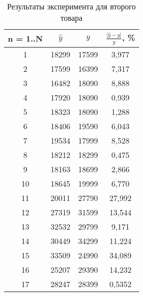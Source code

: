 \documentclass{bmstu}
\begin{document}
\begin{table}[H]
	\caption{Результаты эксперимента для второго товара}
	\begin{center}
		\begin{tabular}{| c | c | c | c |} 
			\hline
			
			\textbf{n = 1..N} & \textbf{$\hat{y}$} & \textbf{$y$} & \textbf{$\frac{|\hat{y} - y|}{y}$, \%} \\  
			
			\hline
			1 & 18299 & 17599 & 3,977\\
			\hline
			2 & 17599 & 16399 & 7,317\\
			\hline
			3 & 16482 & 18090 & 8,888\\
			\hline
			4 & 17920 & 18090 & 0,939\\
			\hline
			5 & 18323 & 18090 & 1,288\\
			\hline
			6 & 18406 & 19590 & 6,043\\
			\hline
			7 & 19534 & 17999 & 8,528\\
			\hline
			8 & 18212 & 18299 & 0,475\\
			\hline
			9 & 18163 & 18699 & 2,866\\
			\hline
			10 & 18645 & 19999 & 6,770\\
			\hline
			11 & 20011 & 27790 & 27,992\\
			\hline
			12 & 27319 & 31599 & 13,544\\
			\hline
			13 & 32532 & 29799 & 9,171\\
			\hline
			14 & 30449 & 34299 & 11,224\\
			\hline
			15 & 33509 & 24990 & 34,089\\
			\hline
			16 & 25207 & 29390 & 14,232\\
			\hline
			17 & 28247 & 28399 & 0,5352\\
			\hline
		\end{tabular}
	\end{center}
\end{table}
\end{document}
